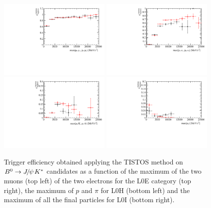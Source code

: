 \begin{figure}[h!]
\centering
\includegraphics[width=0.49\textwidth]{RKst/figs/Efficiencies/efficiencyTisTos_MM.pdf}
\includegraphics[width=0.49\textwidth]{RKst/figs/Efficiencies/efficiencyTisTos_EE_L0E.pdf}
\includegraphics[width=0.49\textwidth]{RKst/figs/Efficiencies/efficiencyTisTos_EE_L0H.pdf}
\includegraphics[width=0.49\textwidth]{RKst/figs/Efficiencies/efficiencyTisTos_EE_L0I.pdf}
\caption{Trigger efficiency obtained applying the TISTOS method on $\Bz\to\jpsi\Kstar$ candidates
as a function of the maximum \pt of the two muons (top left) of the two electrons for the L0E category (top right), 
the maximum \pt of $p$ and $\pi$ for L0H (bottom left) and the maximum \pt of all the final particles for L0I (bottom right).}
\label{fig:tistos_vs_pt}
\end{figure}


